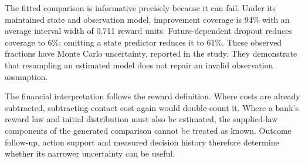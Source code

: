 The fitted comparison is informative precisely because it can fail.
Under its maintained state and observation model, improvement coverage is
94\% with an average interval width of 0.711 reward units. Future-dependent
dropout reduces coverage to 6\%; omitting a state predictor reduces it to
61\%. These observed fractions have Monte Carlo uncertainty, reported in
the study. They demonstrate that resampling an estimated model does not
repair an invalid observation assumption.

The financial interpretation follows the reward definition. Where costs are
already subtracted, subtracting contact cost again would double-count it.
Where a bank's reward law and initial distribution must also be estimated,
the supplied-law components of the generated comparison cannot be treated
as known. Outcome follow-up, action support and measured decision history
therefore determine whether its narrower uncertainty can be useful.


